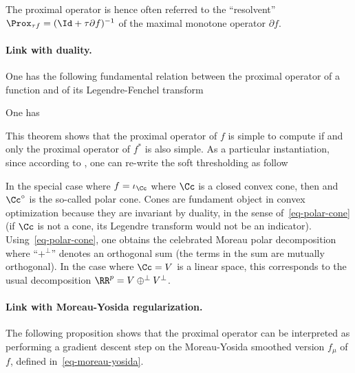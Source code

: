 The proximal operator is hence often referred to the ``resolvent'' $\Prox_{\tau f} = (\Id+\tau\partial f)^{-1}$ of the maximal monotone operator $\partial f$. 

\paragraph{Link with duality.}

One has the following fundamental relation between the proximal operator of a function and of its Legendre-Fenchel transform

\begin{thm}
	One has
\end{thm}

This theorem shows that the proximal operator of $f$ is simple to compute if and only the proximal operator of $f^*$ is also simple. 
%
As a particular instantiation, since according to , one can re-write the soft thresholding as follow

In the special case where $f=\iota_{\Cc}$ where $\Cc$ is a closed convex cone, then
and $\Cc^\circ$ is the so-called polar cone. Cones are fundament object in convex optimization because they are invariant by duality, in the sense of~\eqref{eq-polar-cone} (if $\Cc$ is not a cone, its Legendre transform would not be an indicator).
%
Using~\eqref{eq-polar-cone}, one obtains the celebrated Moreau polar decomposition
where ``$+^\bot$'' denotes an orthogonal sum (the terms in the sum are mutually orthogonal). 
%
In the case where $\Cc=V$ is a linear space, this corresponds to the usual decomposition $\RR^p = V \oplus^\bot V^\bot$. 

\paragraph{Link with Moreau-Yosida regularization.}

The following proposition shows that the proximal operator can be interpreted as performing a gradient descent step on the Moreau-Yosida smoothed version $f_\mu$ of $f$, defined in~\eqref{eq-moreau-yosida}.

